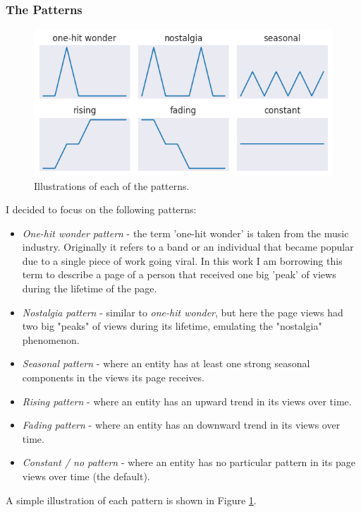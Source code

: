 \documentclass[titlepage]{article}
\begin{document}
\subsubsection{The Patterns}
\begin{figure}
    \centering
    \includegraphics[width=\linewidth]{figures/patterns.png}
    \caption{Illustrations of each of the patterns.}
    \label{fig:patterns-illustration}
\end{figure}
I decided to focus on the following patterns:


\begin{itemize}
    \item \textit{One-hit wonder pattern} - the term 'one-hit wonder' is taken from the music industry. Originally it refers to a band or an individual that became popular due to a single piece of work going viral. In this work I am borrowing this term to describe a page of a person that received one big 'peak' of views during the lifetime of the page.
    \item \textit{Nostalgia pattern} - similar to \textit{one-hit wonder}, but here the page views had two big "peaks" of views during its lifetime, emulating the "nostalgia" phenomenon.
    \item \textit{Seasonal pattern} - where an entity has at least one strong seasonal components in the views its page receives.
    \item \textit{Rising pattern} - where an entity has an upward trend in its views over time.
    \item \textit{Fading pattern} - where an entity has an downward trend in its views over time.
    \item \textit{Constant / no pattern} - where an entity has no particular pattern in its page views over time (the default).
\end{itemize}
A simple illustration of each pattern is shown in Figure \ref{fig:patterns-illustration}.
\end{document}
